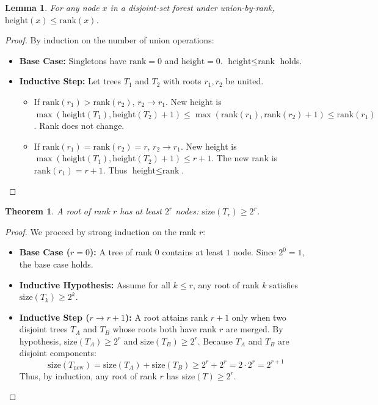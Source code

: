 \documentclass[11pt,a4paper]{article}
\newtheorem{theorem}{Theorem}
\newtheorem{lemma}{Lemma}
\begin{document}
\begin{lemma}
For any node $x$ in a disjoint-set forest under union-by-rank, $\text{height}(x) \le \text{rank}(x)$.
\end{lemma}
\begin{proof}
By induction on the number of union operations:
\begin{itemize}
    \item \textbf{Base Case:} Singletons have $\text{rank} = 0$ and $\text{height} = 0$. $\text{height} \le \text{rank}$ holds.
    \item \textbf{Inductive Step:} Let trees $T_1$ and $T_2$ with roots $r_1, r_2$ be united.
    \begin{itemize}
        \item If $\text{rank}(r_1) > \text{rank}(r_2)$, $r_2 \to r_1$. New height is $\max(\text{height}(T_1), \text{height}(T_2) + 1) \le \max(\text{rank}(r_1), \text{rank}(r_2) + 1) \le \text{rank}(r_1)$. Rank does not change.
        \item If $\text{rank}(r_1) = \text{rank}(r_2) = r$, $r_2 \to r_1$. New height is $\max(\text{height}(T_1), \text{height}(T_2) + 1) \le r + 1$. The new rank is $\text{rank}(r_1) = r + 1$. Thus $\text{height} \le \text{rank}$.
    \end{itemize}
\end{itemize}
\end{proof}

\begin{theorem}
A root of rank $r$ has at least $2^r$ nodes: $\text{size}(T_r) \ge 2^r$.
\end{theorem}
\begin{proof}
We proceed by strong induction on the rank $r$:
\begin{itemize}
    \item \textbf{Base Case ($r=0$):} A tree of rank $0$ contains at least $1$ node. Since $2^0 = 1$, the base case holds.
    \item \textbf{Inductive Hypothesis:} Assume for all $k \le r$, any root of rank $k$ satisfies $\text{size}(T_k) \ge 2^k$.
    \item \textbf{Inductive Step ($r \to r+1$):} A root attains rank $r+1$ only when two disjoint trees $T_A$ and $T_B$ whose roots both have rank $r$ are merged.
    By hypothesis, $\text{size}(T_A) \ge 2^r$ and $\text{size}(T_B) \ge 2^r$.
    Because $T_A$ and $T_B$ are disjoint components:
    \[
    \text{size}(T_{\text{new}}) = \text{size}(T_A) + \text{size}(T_B) \ge 2^r + 2^r = 2 \cdot 2^r = 2^{r+1}
    \]
    Thus, by induction, any root of rank $r$ has $\text{size}(T) \ge 2^r$.
\end{itemize}
\end{proof}
\end{document}

